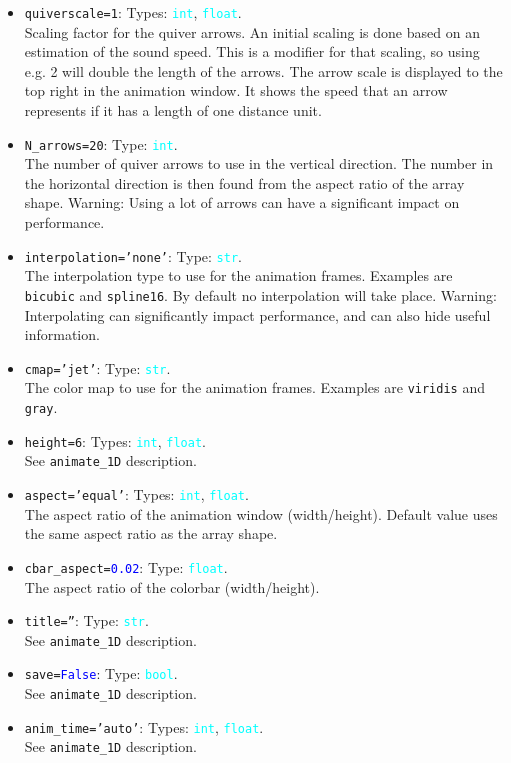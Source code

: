 \documentclass{article}
\newcommand{\ttt}[1]{\texttt{#1}}
\newcommand{\ptype}[1]{\texttt{\textcolor{cyan}{#1}}}
\newcommand{\cbl}[1]{\textcolor{blue}{#1}}
\newcommand{\cro}[1]{\textcolor{RedOrange}{#1}}
\newcommand{\cyo}[1]{\textcolor{YellowOrange}{#1}}
\begin{document}
\begin{itemize}
	\item \ttt{\cro{quiverscale}=1}: Types: \ptype{int}, \ptype{float}.\\Scaling factor for the quiver arrows. An initial scaling is done based on an estimation of the sound speed. This is a modifier for that scaling, so using e.g. 2 will double the length of the arrows. The arrow scale is displayed to the top right in the animation window. It shows the speed that an arrow represents if it has a length of one distance unit.
	\item \ttt{\cro{N\_arrows}=20}: Type: \ptype{int}.\\The number of quiver arrows to use in the vertical direction. The number in the horizontal direction is then found from the aspect ratio of the array shape. Warning: Using a lot of arrows can have a significant impact on performance.
	\item \ttt{\cro{interpolation}=\cyo{'none'}}: Type: \ptype{str}.\\The interpolation type to use for the animation frames. Examples are \ttt{bicubic} and \ttt{spline16}. By default no interpolation will take place. Warning: Interpolating can significantly impact performance, and can also hide useful information.
	\item \ttt{\cro{cmap}=\cyo{'jet'}}: Type: \ptype{str}.\\The color map to use for the animation frames. Examples are \ttt{viridis} and \ttt{gray}.
	\item \ttt{\cro{height}=6}: Types: \ptype{int}, \ptype{float}.\\See \ttt{animate\_1D} description.
	\item \ttt{\cro{aspect}=\cyo{'equal'}}: Types: \ptype{int}, \ptype{float}.\\The aspect ratio of the animation window (width/height). Default value uses the same aspect ratio as the array shape.
	\item \ttt{\cro{cbar\_aspect}=\cbl{0.02}}: Type: \ptype{float}.\\The aspect ratio of the colorbar (width/height).
	\item \ttt{\cro{title}=\cyo{''}}: Type: \ptype{str}.\\See \ttt{animate\_1D} description.
	\item \ttt{\cro{save}=\cbl{False}}: Type: \ptype{bool}.\\See \ttt{animate\_1D} description.
	\item \ttt{\cro{anim\_time}=\cyo{'auto'}}: Types: \ptype{int}, \ptype{float}.\\See \ttt{animate\_1D} description.

\end{itemize}
\end{document}
